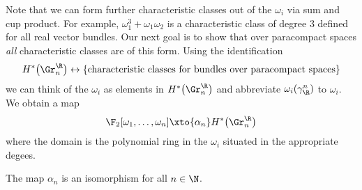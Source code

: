Note that we can form further characteristic classes out of the $\omega_i$ via sum and cup product.
For example, $\omega_1^3 + \omega_1 \omega_2$ is a characteristic class of degree 3 defined for all real vector bundles.
Our next goal is to show that over paracompact spaces \emph{all} characteristic classes are of this form.
Using the identification 
\begin{equation*}
	H^*\big(\Gr_n^{\R}\big) \leftrightarrow \{\text{characteristic classes for bundles over paracompact spaces}\}
\end{equation*}
we can think of the $\omega_i$ as elements in $H^*\big(\Gr^\R_n\big)$ and abbreviate $\omega_i(\gamma_\R^n)$ to $\omega_i$.
We obtain a map
\begin{equation*}
	\F_2[\omega_1, \ldots, \omega_n] \xto{\alpha_n} H^*\big(\Gr_n^\R\big)
\end{equation*}
where the domain is the polynomial ring in the $\omega_i$ situated in the appropriate degees.
\begin{theorem}
	The map $\alpha_n$ is an isomorphism for all $n \in \N$.
\end{theorem}
